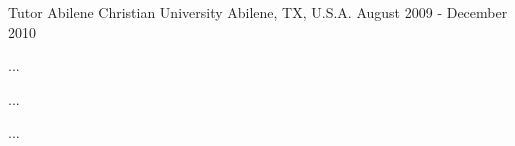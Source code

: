 \begin{cventries}
  \cventry
    {Tutor} %
    {Abilene Christian University} %
    {Abilene, TX, U.S.A.} %
    {August 2009 - December 2010} %
    {
      \begin{cvitems} %
        \item {...}
        \item {...}
        \item {...}
      \end{cvitems}
    }

\end{cventries}

